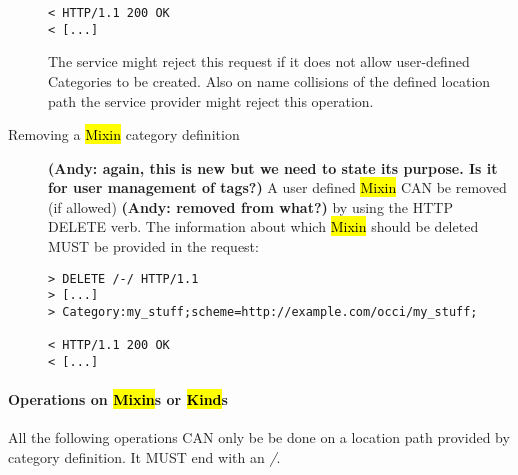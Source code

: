 \documentclass[10pt,a4paper]{article}
\begin{document}
\begin{description}
\begin{verbatim}
< HTTP/1.1 200 OK
< [...]
\end{verbatim}
The service might reject this request if it does not allow
user-defined Categories to be created. Also on name collisions of the
defined location path the service provider might reject this
operation.

\item[Removing a \hl{Mixin} category definition] 
\textbf{(Andy: again, this is new but we need to state its purpose. Is it for user management of tags?)}
A user defined
  \hl{Mixin} CAN be removed (if allowed) \textbf{(Andy: removed from what?)} by 
  using the HTTP DELETE
  verb. The information about which \hl{Mixin} should be deleted MUST
  be provided in the request:
\begin{verbatim}
> DELETE /-/ HTTP/1.1
> [...]
> Category:my_stuff;scheme=http://example.com/occi/my_stuff;

< HTTP/1.1 200 OK
< [...]
\end{verbatim}
\end{description}

\paragraph{Operations on \hl{Mixin}s or \hl{Kind}s}
All the following operations CAN only be be done on a location path
provided by category definition. It MUST end with an \emph{/}.
\end{document}
